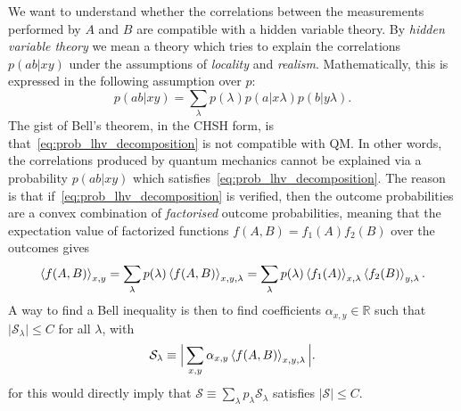 \documentclass[a4paper]{report}
\newcommand{\RR}{\mathbb{R}}
\newcommand{\calS}{{\mathcal{S}}}
\begin{document}
We want to understand whether the correlations between the measurements performed by $A$ and $B$ are compatible with a hidden variable theory.
By \emph{hidden variable theory} we mean a theory which tries to explain the correlations $p(ab|xy)$ under the assumptions of \emph{locality} and \emph{realism}.
Mathematically, this is expressed in the following assumption over $p$:
\begin{equation}
    p(ab|xy) = \sum_\lambda p(\lambda) p(a|x\lambda)p(b|y\lambda).
    \label{eq:prob_lhv_decomposition}
\end{equation}
The gist of Bell's theorem, in the CHSH form, is that~\cref{eq:prob_lhv_decomposition} is not compatible with \ac{QM}. In other words, the correlations produced by quantum mechanics cannot be explained via a probability $p(ab|xy)$ which satisfies~\cref{eq:prob_lhv_decomposition}.
The reason is that if~\cref{eq:prob_lhv_decomposition} is verified, then the outcome probabilities are a convex combination of \emph{factorised} outcome probabilities,
meaning that the expectation value of factorized functions $f(A,B)=f_1(A)f_2(B)$ over the outcomes gives
\begin{equation}
    \expval{f(A,B)}_{x,y} =
    \sum_\lambda p(\lambda) \expval{f(A,B)}_{x,y,\lambda} =
    \sum_\lambda p(\lambda) \expval{f_1(A)}_{x,\lambda} \expval{f_2(B)}_{y,\lambda}.
\end{equation}
A way to find a Bell inequality is then to find coefficients $\alpha_{x,y}\in\RR$ such that $\lvert \calS_\lambda\rvert\le C$ for all $\lambda$, with
\begin{equation}
    \calS_\lambda \equiv \Big\lvert
        \sum_{x,y} \alpha_{x,y} \expval{f(A,B)}_{x,y,\lambda}
    \Big\rvert.
\end{equation}
for this would directly imply that $\calS\equiv\sum_\lambda p_\lambda \calS_\lambda$ satisfies $|\calS|\le C$.
\end{document}

